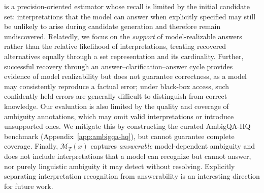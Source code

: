  \circleclar{} is a precision-oriented estimator whose recall is limited by the initial candidate set: interpretations that the model can answer when explicitly specified may still be unlikely to arise during candidate generation and therefore remain undiscovered. Relatedly, we focus on the \emph{support} of model-realizable answers rather than the relative likelihood of interpretations, treating recovered alternatives equally through a set representation and its cardinality. Further, successful recovery through an answer--clarification--answer cycle provides evidence of model realizability but does not guarantee correctness, as a model may consistently reproduce a factual error; under black-box access, such confidently held errors are generally difficult to distinguish from correct knowledge. Our evaluation is also limited by the quality and coverage of ambiguity annotations, which may omit valid interpretations or introduce unsupported ones. We mitigate this by constructing the curated AmbigQA-HQ benchmark (Appendix~\ref{app:ambigqa-hq}), but cannot guarantee complete coverage. Finally, \(\mathcal{M}_T(x)\) captures \emph{answerable} model-dependent ambiguity and does not include interpretations that a model can recognize but cannot answer, nor purely linguistic ambiguity it may detect without resolving. Explicitly separating interpretation recognition from answerability is an interesting direction for future work.




